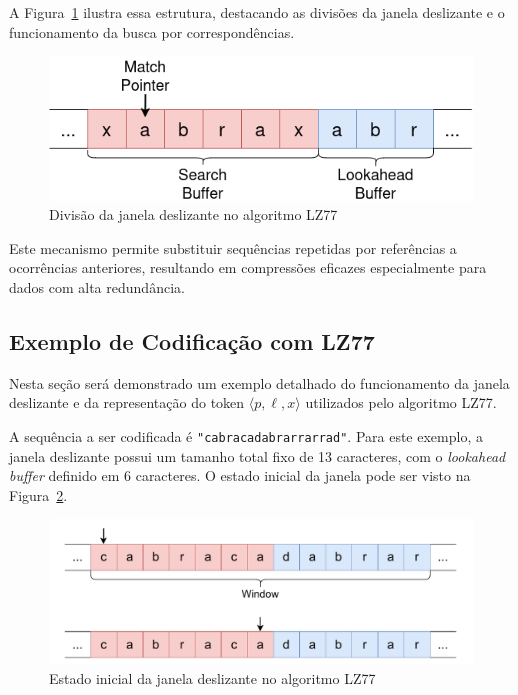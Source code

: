 A Figura~\ref{fig:Diagrama LZ77} ilustra essa estrutura, destacando as divisões
da janela deslizante e o funcionamento da busca por correspondências.

\begin{figure}[ht]
  \centering
  \caption{Divisão da janela deslizante no algoritmo LZ77}
  \label{fig:Diagrama LZ77}
  \includegraphics[width=12cm]{figuras/DiagramasTCC-LZ77-template}
\end{figure}

Este mecanismo permite substituir sequências repetidas por referências a
ocorrências anteriores, resultando em compressões eficazes especialmente para
dados com alta redundância.

\subsection{Exemplo de Codificação com LZ77}\label{sec:LZ77_exemplo}

Nesta seção será demonstrado um exemplo detalhado do funcionamento da janela
deslizante e da representação do token $\langle p, \ell, x \rangle$ utilizados
pelo algoritmo LZ77. 

A sequência a ser codificada é \texttt{"cabracadabrarrarrad"}. Para este exemplo, a janela deslizante possui
um tamanho total fixo de 13 caracteres, com o \textit{lookahead buffer}
definido em 6 caracteres. O estado inicial da janela pode ser visto na
Figura~\ref{fig:Estado_0_LZ77}.

\begin{figure}[htp]
  \centering
  \caption{Estado inicial da janela deslizante no algoritmo LZ77}
  \label{fig:Estado_0_LZ77}
  \includegraphics[width=15cm]{figuras/DiagramasTCC-LZ77-Estado-0.pdf}
\end{figure}

